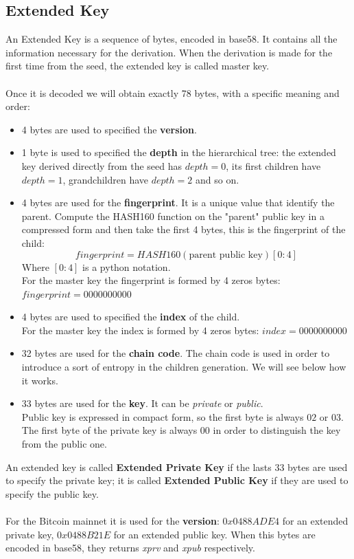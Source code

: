 \subsection{Extended Key}
An Extended Key is a sequence of bytes, encoded in base58. It contains all the information necessary for the derivation. When the derivation is made for the first time from the seed, the extended key is called master key.\\ \\
Once it is decoded we will obtain exactly 78 bytes, with a specific meaning and order:
\begin{itemize}[label=$\circledast$]
	\item 4 bytes are used to specified the \textbf{version}.
	\item 1 byte is used to specified the \textbf{depth} in the hierarchical tree: the extended key derived directly from the seed has $depth=0$, its first children have $depth=1$, grandchildren have $depth=2$ and so on.
	\item 4 bytes are used for the \textbf{fingerprint}. It is a unique value that identify the parent. Compute the HASH160 function on the "parent" public key in a compressed form and then take the first 4 bytes, this is the fingerprint of the child:
	\begin{equation*}
	fingerprint=HASH160(\text{parent public key})[0:4]
	\end{equation*}
	Where $[0:4]$ is a python notation.\\
	For the master key the fingerprint is formed by 4 zeros bytes: $fingerprint=0000000000$
	\item 4 bytes are used to specified the \textbf{index} of the child. \\
	For the master key the index is formed by 4 zeros bytes: $index=0000000000$
	\item 32 bytes are used for the \textbf{chain code}. The chain code is used in order to introduce a sort of entropy in the children generation. We will see below how it works.
	\item 33 bytes are used for the \textbf{key}. It can be \textit{private} or \textit{public}. \\ Public key is expressed in compact form, so the first byte is always $02$ or $03$. The first byte of the private key is always $00$ in order to distinguish the key from the public one.\\
\end{itemize}
An extended key is called \textbf{Extended Private Key} if the lasts 33 bytes are used to specify the private key; it is called \textbf{Extended Public Key} if they are used to specify the public key.
\\ \\
For the Bitcoin mainnet it is used for the \textbf{version}: $0x0488ADE4$ for an extended private key, $0x0488B21E$ for an extended public key. When this bytes are encoded in base58, they returns \textit{xprv} and \textit{xpub} respectively.
 
